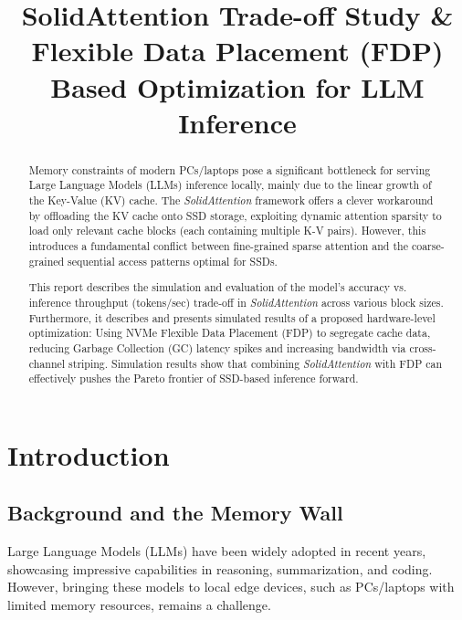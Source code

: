 \documentclass[conference]{IEEEtran}
\begin{document}
\title{SolidAttention Trade-off Study \& Flexible Data Placement (FDP) Based Optimization for LLM Inference}

\author{
}

\maketitle

\begin{abstract}
    Memory constraints of modern PCs/laptops pose a significant bottleneck for serving Large Language Models (LLMs) inference locally, mainly due to the linear growth of the Key-Value (KV) cache. The \textit{SolidAttention} framework offers a clever workaround by offloading the KV cache onto SSD storage, exploiting dynamic attention sparsity to load only relevant cache blocks (each containing multiple K-V pairs). However, this introduces a fundamental conflict between fine-grained sparse attention and the coarse-grained sequential access patterns optimal for SSDs. 

    This report describes the simulation and evaluation of the model's accuracy vs. inference throughput (tokens/sec) trade-off in \textit{SolidAttention} across various block sizes. Furthermore, it describes and presents simulated results of a proposed hardware-level optimization: Using NVMe Flexible Data Placement (FDP) to segregate cache data, reducing Garbage Collection (GC) latency spikes and increasing bandwidth via cross-channel striping. Simulation results show that combining \textit{SolidAttention} with FDP can effectively pushes the Pareto frontier of SSD-based inference forward.
\end{abstract}

\section{Introduction}
    
    \subsection{Background and the Memory Wall}
        Large Language Models (LLMs) have been widely adopted in recent years, showcasing impressive capabilities in reasoning, summarization, and coding. However, bringing these models to local edge devices, such as PCs/laptops with limited memory resources, remains a challenge.
\end{document}
